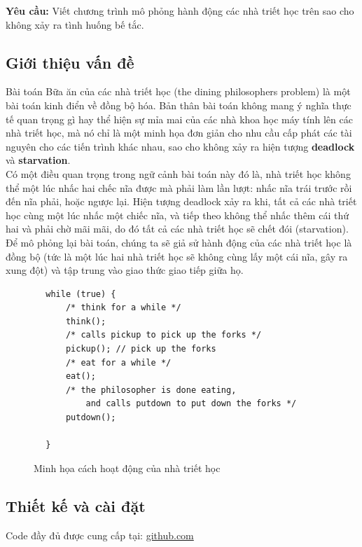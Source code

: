 \documentclass{article}
\begin{document}
\textbf{Yêu cầu: }Viết chương trình mô phỏng hành động các nhà triết học trên sao cho không xảy ra tình huống bế tắc.
\subsection{Giới thiệu vấn đề}
Bài toán Bữa ăn của các nhà triết học (the dining philosophers problem) là một bài toán kinh điển về đồng bộ hóa.
Bản thân bài toán không mang ý nghĩa thực tế quan trọng gì hay thể hiện sự mỉa mai của các nhà khoa học máy tính lên các nhà triết học,
mà nó chỉ là một minh họa đơn giản cho nhu cầu cấp phát các tài nguyên cho các tiến trình khác nhau, sao cho không xảy ra
hiện tượng \textbf{deadlock} và \textbf{starvation}. \\

Có một điều quan trọng trong ngữ cảnh bài toán này đó là, nhà triết học không thể một lúc nhấc hai chếc nĩa được mà phải làm lần lượt:
nhấc nĩa trái trước rồi đến nĩa phải, hoặc ngược lại. Hiện tượng deadlock xảy ra khi, tất cả các nhà triết học cùng một lúc nhấc một chiếc nĩa,
và tiếp theo không thể nhấc thêm cái thứ hai và phải chờ mãi mãi, do đó tất cả các nhà triết học sẽ chết đói (starvation). Để mô phỏng
lại bài toán, chúng ta sẽ giả sử  hành động của các nhà triết học là đồng bộ (tức là một lúc hai nhà triết học sẽ không cùng lấy một cái nĩa,
gây ra xung đột) và tập trung vào giao thức giao tiếp giữa họ. \\


\begin{shaded}

    \begin{lstlisting}
        while (true) {
            /* think for a while */
            think();
            /* calls pickup to pick up the forks */
            pickup(); // pick up the forks
            /* eat for a while */
            eat();
            /* the philosopher is done eating, 
                and calls putdown to put down the forks */
            putdown();

        }
    \end{lstlisting}
\end{shaded}

\begin{figure}[h]
    \centering
    \caption{Minh họa cách hoạt động của nhà triết học}
\end{figure}

\subsection{Thiết kế và cài đặt}
Code đầy đủ được cung cấp tại: \href{www.github.com}{github.com} \\
\end{document}
